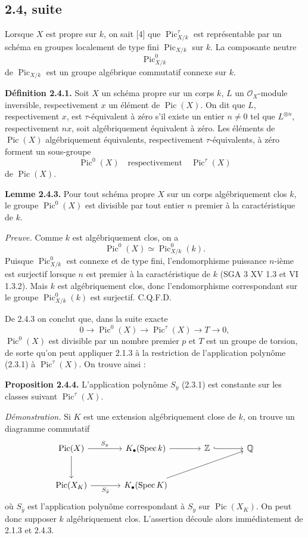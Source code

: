 \documentclass[11pt]{article}
\newcommand{\Spec}{\operatorname{Spec}}
\providecommand{\Pic}{\operatorname{Pic}}
\begin{document}
\subsection*{2.4, suite}

Lorsque \(X\) est propre sur \(k\), on sait [4] que \(\Pic^\tau_{X/k}\) est représentable par un schéma en groupes localement de type fini \(\Pic_{X/k}\) sur \(k\). La composante neutre
\[
 \Pic^0_{X/k}
\]
de \(\Pic_{X/k}\) est un groupe algébrique commutatif connexe sur \(k\).

\textbf{Définition 2.4.1.} Soit \(X\) un schéma propre sur un corps \(k\), \(L\) un \(\mathcal O_X\)-module inversible, respectivement \(x\) un élément de \(\Pic(X)\). On dit que \(L\), respectivement \(x\), est \(\tau\)-équivalent à zéro s'il existe un entier \(n\ne0\) tel que \(L^{\otimes n}\), respectivement \(nx\), soit algébriquement équivalent à zéro. Les éléments de \(\Pic(X)\) algébriquement équivalents, respectivement \(\tau\)-équivalents, à zéro forment un sous-groupe
\[
 \Pic^0(X)\quad\text{respectivement}\quad \Pic^\tau(X)
\]
de \(\Pic(X)\).

\textbf{Lemme 2.4.3.} Pour tout schéma propre \(X\) sur un corps algébriquement clos \(k\), le groupe \(\Pic^0(X)\) est divisible par tout entier \(n\) premier à la caractéristique de \(k\).

\emph{Preuve.} Comme \(k\) est algébriquement clos, on a
\[
 \Pic^0(X)\simeq \Pic^0_{X/k}(k).
\]
Puisque \(\Pic^0_{X/k}\) est connexe et de type fini, l'endomorphisme puissance \(n\)-ième est surjectif lorsque \(n\) est premier à la caractéristique de \(k\) (SGA 3 XV 1.3 et VI 1.3.2). Mais \(k\) est algébriquement clos, donc l'endomorphisme correspondant sur le groupe \(\Pic^0_{X/k}(k)\) est surjectif. C.Q.F.D.

De 2.4.3 on conclut que, dans la suite exacte
\[
0\longrightarrow\Pic^0(X)\longrightarrow\Pic^\tau(X)\longrightarrow T\longrightarrow0,
\]
\(\Pic^0(X)\) est divisible par un nombre premier \(p\) et \(T\) est un groupe de torsion, de sorte qu'on peut appliquer 2.1.3 à la restriction de l'application polynôme (2.3.1) à \(\Pic^\tau(X)\). On trouve ainsi :

\textbf{Proposition 2.4.4.} L'application polynôme \(S_y\) (2.3.1) est constante sur les classes suivant \(\Pic^\tau(X)\).

\emph{Démonstration.} Si \(K\) est une extension algébriquement close de \(k\), on trouve un diagramme commutatif
\[
\begin{tikzcd}[column sep=large,row sep=large]
\Pic(X) \arrow[r,"S_y"] \arrow[d] &
K_\bullet(\Spec k) \arrow[r] &
\mathbb Z \arrow[r,hook] & \mathbb Q\\
\Pic(X_K) \arrow[r,"S_{\bar y}"'] &
K_\bullet(\Spec K) \arrow[urr] &&
\end{tikzcd}
\]
où \(S_{\bar y}\) est l'application polynôme correspondant à \(S_y\) sur \(\Pic(X_K)\). On peut donc supposer \(k\) algébriquement clos. L'assertion découle alors immédiatement de 2.1.3 et 2.4.3.
\end{document}
